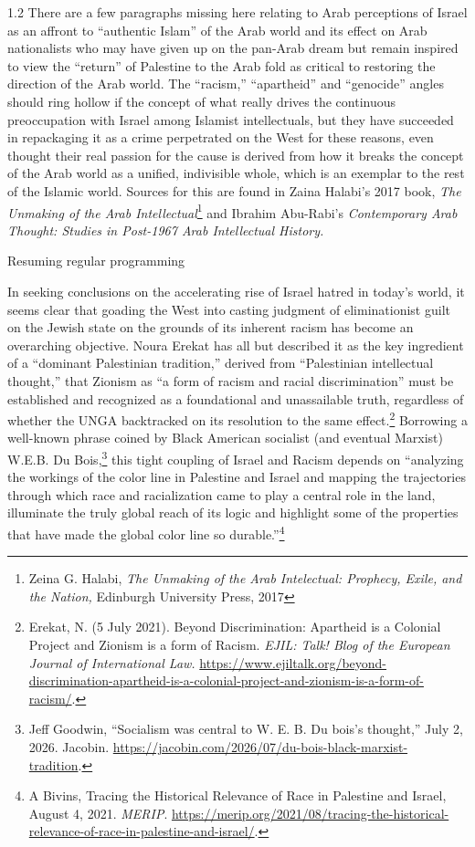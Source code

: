 \documentclass[../unravbook.tex]{subfiles}
\begin{document}
\begin{spacing}{1.2}
There are a few paragraphs missing here relating to Arab perceptions of Israel as an affront to \enquote{authentic Islam} of the Arab world and its effect on Arab nationalists who may have given up on the pan-Arab dream but remain inspired to view the \enquote{return} of Palestine to the Arab fold as critical to restoring the direction of the Arab world. The \enquote{racism,} \enquote{apartheid}
and \enquote{genocide} angles should ring hollow if the concept of what really drives the continuous preoccupation with Israel among Islamist intellectuals, but they have succeeded in repackaging it as a crime perpetrated on the West for these reasons, even thought their real passion for the cause is derived from how it breaks the concept of the Arab world as a unified, indivisible whole, which is an exemplar to the rest of the Islamic world. Sources for this are found in Zaina Halabi's 2017 book, \textit{The Unmaking of the Arab Intellectual}\footnote{Zeina G. Halabi, \textit{The Unmaking of the Arab Intelectual: Prophecy, Exile, and the Nation,} Edinburgh University Press, 2017} and Ibrahim Abu-Rabi's \textit{Contemporary Arab Thought: Studies in Post-1967 Arab Intellectual History.} \parencite{Abu-Rabi-2004}

Resuming regular programming

In seeking conclusions on the accelerating rise of Israel hatred in today's world, it seems clear that goading the West into casting judgment of eliminationist guilt on the Jewish state on the grounds of its inherent racism has become an overarching objective. Noura Erekat has all but described it as the key ingredient of a ``dominant Palestinian tradition,'' derived from ``Palestinian intellectual thought,'' that Zionism as \enquote{a form of racism and racial discrimination} must be established and recognized as a foundational and unassailable truth, regardless of whether the UNGA backtracked on its resolution to the same effect.\footnote{Erekat, N. (5 July 2021). Beyond Discrimination: Apartheid is a Colonial Project and Zionism is a form of Racism. \textit{EJIL: Talk! Blog of the European Journal of International Law.} \url{https://www.ejiltalk.org/beyond-discrimination-apartheid-is-a-colonial-project-and-zionism-is-a-form-of-racism/}.} Borrowing a well-known phrase coined by Black American socialist (and eventual Marxist) W.E.B. Du Bois,\footnote{Jeff Goodwin, \enquote{Socialism was central to W. E. B. Du bois's thought,} July 2, 2026. Jacobin. \url{https://jacobin.com/2026/07/du-bois-black-marxist-tradition}.} this tight coupling of Israel and Racism depends on ``analyzing the workings of the color line in Palestine and Israel and mapping the trajectories through which race and racialization came to play a central role in the land, illuminate the truly global reach of its logic and highlight some of the properties that have made the global color line so durable.''\footnote{A Bivins, Tracing the Historical Relevance of Race in Palestine and Israel, August 4, 2021. \textit{MERIP}.  \url{https://merip.org/2021/08/tracing-the-historical-relevance-of-race-in-palestine-and-israel/}.} 


\end{spacing}
\end{document}

